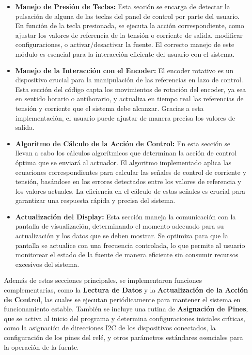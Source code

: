 \begin{itemize}
    \item \textbf{Manejo de Presión de Teclas:} Esta sección se encarga de detectar la pulsación de alguna de las teclas del panel de control por parte del usuario. En función de la tecla presionada, se ejecuta la acción correspondiente, como ajustar los valores de referencia de la tensión o corriente de salida, modificar configuraciones, o activar/desactivar la fuente. El correcto manejo de este módulo es esencial para la interacción eficiente del usuario con el sistema.
    \item \textbf{Manejo de la Interacción con el Encoder:} El encoder rotativo es un dispositivo crucial para la manipulación de las referencias en lazo de control. Esta sección del código capta los movimientos de rotación del encoder, ya sea en sentido horario o antihorario, y actualiza en tiempo real las referencias de tensión y corriente que el sistema debe alcanzar. Gracias a esta implementación, el usuario puede ajustar de manera precisa los valores de salida.
    \item \textbf{Algoritmo de Cálculo de la Acción de Control:} En esta sección se llevan a cabo los cálculos algorítmicos que determinan la acción de control óptima que se enviará al actuador. El algoritmo implementado aplica las ecuaciones correspondientes para calcular las señales de control de corriente y tensión, basándose en los errores detectados entre los valores de referencia y los valores actuales. La eficiencia en el cálculo de estas señales es crucial para garantizar una respuesta rápida y precisa del sistema.

    \item \textbf{Actualización del Display:} Esta sección maneja la comunicación con la pantalla de visualización, determinando el momento adecuado para su actualización y los datos que se deben mostrar. Se optimiza para que la pantalla se actualice con una frecuencia controlada, lo que permite al usuario monitorear el estado de la fuente de manera eficiente sin consumir recursos excesivos del sistema.
\end{itemize}

Además de estas secciones principales, se implementaron funciones complementarias, como la \textbf{Lectura de Datos} y la \textbf{Actualización de la Acción de Control}, las cuales se ejecutan periódicamente para mantener el sistema en funcionamiento estable. También se incluye una rutina de \textbf{Asignación de Pines}, que se activa al inicio del programa y determina configuraciones iniciales críticas, como la asignación de direcciones I2C de los dispositivos conectados, la configuración de los pines del relé, y otros parámetros estándares esenciales para la operación de la fuente.


